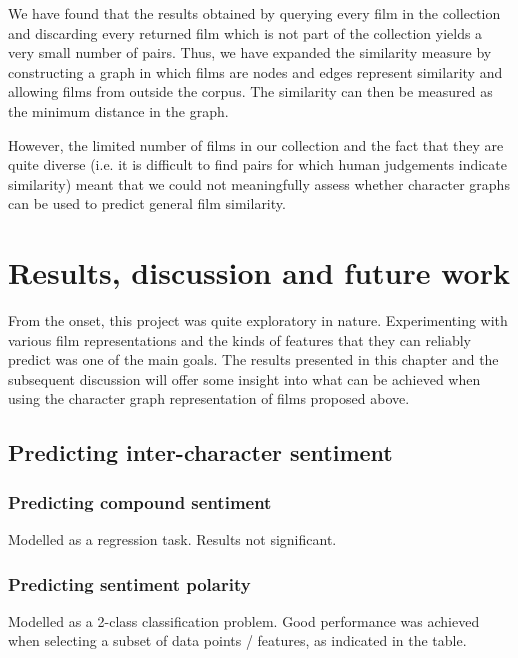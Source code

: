 \documentclass[bsc,frontabs,singlespacing,parskip]{infthesis} %
\begin{document}
We have found that the results obtained by querying every film in the collection and discarding every returned film which is not part of the collection yields a very small number of pairs. Thus, we have expanded the similarity measure by constructing a graph in which films are nodes and edges represent similarity and allowing films from outside the corpus. The similarity can then be measured as the minimum distance in the graph.

However, the limited number of films in our collection and the fact that they are quite diverse (i.e. it is difficult to find pairs for which human judgements indicate similarity) meant that we could not meaningfully assess whether character graphs can be used to predict general film similarity. 

\chapter{Results, discussion and future work}

From the onset, this project was quite exploratory in nature. Experimenting with various film representations and the kinds of features that they can reliably predict was one of the main goals. The results presented in this chapter and the subsequent discussion will offer some insight into what can be achieved when using the character graph representation of films proposed above.

\section{Predicting inter-character sentiment}

\subsection{Predicting compound sentiment}
Modelled as a regression task. Results not significant.

\subsection{Predicting sentiment polarity}
Modelled as a 2-class classification problem. Good performance was achieved when selecting a subset of data points / features, as indicated in the table.
\end{document}
